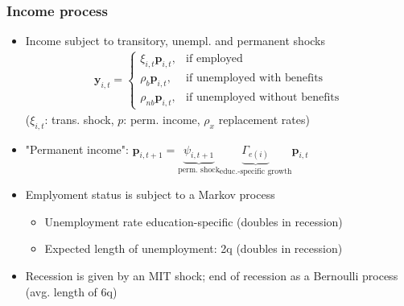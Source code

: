 \documentclass[pdflatex]{beamer}
\begin{document}
\begin{frame}
\frametitle{ Income process}

	\begin{itemize}

		\item Income subject to transitory, unempl. and permanent shocks
			\begin{align}
				\mathbf{y}_{i,t} =   \begin{cases}
				\xi_{i,t}\mathbf{p}_{i,t}, & \text{if employed} \\
				\rho_b \mathbf{p}_{i,t}, & \text{if unemployed with benefits} \\
				\rho_{nb} \mathbf{p}_{i,t}, & \text{if unemployed without benefits} 
				\end{cases}
			\end{align}
			($\xi_{i,t}$: trans. shock, $p$: perm. income, $\rho_x$ replacement rates)
			
		\item "Permanent income":  $\mathbf{p}_{i,t+1} = \underbrace{\psi_{i,t+1}}_{\text{perm. shock}} \underbrace{\Gamma_{e(i)}}_{\text{educ.-specific growth}}\mathbf{p}_{i,t}$ 

		\item Emplyoment status is subject to a Markov process
		\begin{itemize}
			\item Unemployment rate education-specific (doubles in recession)
			\item Expected length of unemployment: 2q  (doubles in recession)
		\end{itemize}
		
		\item Recession is given by an MIT shock; end of recession as a Bernoulli process (avg. length of 6q)
	
	\end{itemize}

\end{frame}
\end{document}
